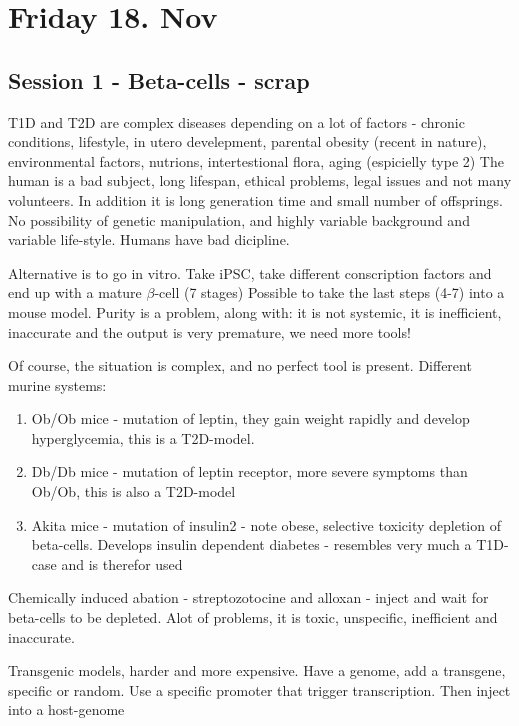 \documentclass[12p]{article}
\begin{document}
\section*{Friday 18. Nov}

\subsection*{Session 1 - Beta-cells - scrap}

T1D and T2D are complex diseases depending on a lot of factors - chronic conditions, lifestyle, in utero develepment, parental obesity (recent in nature), environmental factors, nutrions, intertestional flora, aging (espicielly type 2)
The human is a bad subject, long lifespan, ethical problems, legal issues and not many volunteers.
In addition it is long generation time and small number of offsprings.
No possibility of genetic manipulation, and highly variable background and variable life-style.
Humans have bad dicipline.

Alternative is to go in vitro.
Take iPSC, take different conscription factors and end up with a mature $\beta$-cell (7 stages)
Possible to take the last steps (4-7) into a mouse model.
Purity is a problem, along with: it is not systemic, it is inefficient, inaccurate and the output is very premature, we need more tools!

Of course, the situation is complex, and no perfect tool is present.
Different murine systems:

\begin{enumerate}
    \item
	Ob/Ob mice - mutation of leptin, they gain weight rapidly and develop hyperglycemia, this is a T2D-model.
    \item
	Db/Db mice - mutation of leptin receptor, more severe symptoms than Ob/Ob, this is also a T2D-model
    \item
	Akita mice - mutation of insulin2 - note obese, selective toxicity depletion of beta-cells. Develops insulin dependent diabetes - resembles very much a T1D-case and is therefor used 
\end{enumerate}

Chemically induced abation - streptozotocine and alloxan - inject and wait for beta-cells to be depleted.
Alot of problems, it is toxic, unspecific, inefficient and inaccurate.

Transgenic models, harder and more expensive.
Have a genome, add a transgene, specific or random. 
Use a specific promoter that trigger transcription. 
Then inject into a host-genome
\end{document}
